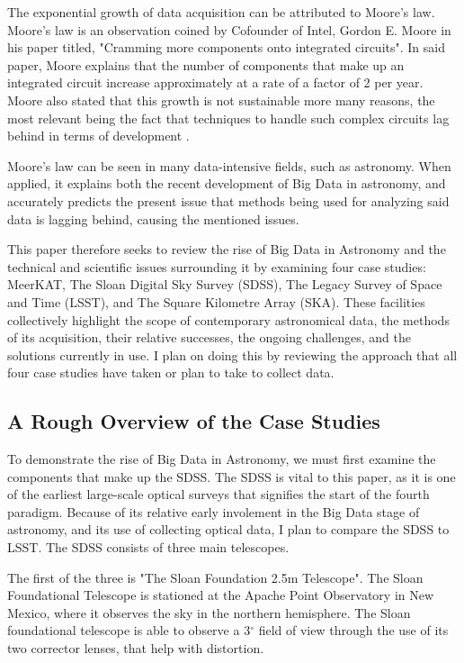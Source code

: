 \documentclass[preprint2,linenumbers, longauthor]{aastex631}
\begin{document}
The exponential growth of data acquisition can be attributed to Moore's law. Moore's law is an observation coined by Cofounder of Intel, Gordon E. Moore in his paper titled, "Cramming more components onto integrated circuits". 
In said paper, Moore explains that the number of components that make up an integrated circuit increase approximately at a rate of a factor of 2 per year.
Moore also stated that this growth is not sustainable more many reasons, the most relevant being the fact that techniques to handle such complex circuits lag behind in terms of development \cite{mooreCrammingMoreComponents2006}.

Moore's law can be seen in many data-intensive fields, such as astronomy.
When applied, it explains both the recent development of Big Data in astronomy, and accurately predicts the present issue that methods being used for analyzing said data is lagging behind, causing the mentioned issues.

This paper therefore seeks to review the rise of Big Data in Astronomy and the technical and scientific issues surrounding it by examining four case studies: MeerKAT, The Sloan Digital Sky Survey (SDSS), The Legacy Survey of Space and Time (LSST), and The Square Kilometre Array (SKA). 
These facilities collectively highlight the scope of contemporary astronomical data, the methods of its acquisition, their relative successes, the ongoing challenges, and the solutions currently in use. I plan on doing this by reviewing the approach that all four case studies have taken or plan to take to collect data.

\subsection{A Rough Overview of the Case Studies}
To demonstrate the rise of Big Data in Astronomy, we must first examine the components that make up the SDSS. The SDSS is vital to this paper, as it is one of the earliest large-scale optical surveys that signifies the start of the fourth paradigm. 
Because of its relative early involement in the Big Data stage of astronomy, and its use of collecting optical data, I plan to compare the SDSS to LSST. The SDSS
consists of three main telescopes.

The first of the three is "The Sloan Foundation 2.5m Telescope". 
The Sloan Foundational Telescope is stationed at the Apache Point Observatory in New Mexico, where it observes the sky in the northern hemisphere. 
The Sloan foundational telescope is able to observe a 3$^\circ$ field of view through the use of its two corrector lenses, that help with distortion. \cite{gunn25TelescopeSloan2006}
\end{document}
